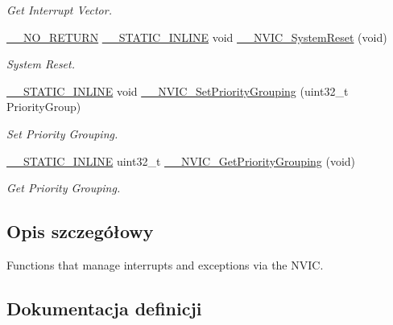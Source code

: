 \begin{DoxyCompactItemize}
\begin{DoxyCompactList}\small\item\em Get Interrupt Vector. \end{DoxyCompactList}\item 
\hyperlink{cmsis__iccarm_8h_a153a4a31b276a9758959580538720a51}{\+\_\+\+\_\+\+N\+O\+\_\+\+R\+E\+T\+U\+RN} \hyperlink{cmsis__iccarm_8h_aba87361bfad2ae52cfe2f40c1a1dbf9c}{\+\_\+\+\_\+\+S\+T\+A\+T\+I\+C\+\_\+\+I\+N\+L\+I\+NE} void \hyperlink{group___c_m_s_i_s___core___n_v_i_c_functions_ga0d9aa2d30fa54b41eb780c16e35b676c}{\+\_\+\+\_\+\+N\+V\+I\+C\+\_\+\+System\+Reset} (void)
\begin{DoxyCompactList}\small\item\em System Reset. \end{DoxyCompactList}\item 
\hyperlink{cmsis__iccarm_8h_aba87361bfad2ae52cfe2f40c1a1dbf9c}{\+\_\+\+\_\+\+S\+T\+A\+T\+I\+C\+\_\+\+I\+N\+L\+I\+NE} void \hyperlink{group___c_m_s_i_s___core___n_v_i_c_functions_gafc94dcbaee03e4746ade1f5bb9aaa56d}{\+\_\+\+\_\+\+N\+V\+I\+C\+\_\+\+Set\+Priority\+Grouping} (uint32\+\_\+t Priority\+Group)
\begin{DoxyCompactList}\small\item\em Set Priority Grouping. \end{DoxyCompactList}\item 
\hyperlink{cmsis__iccarm_8h_aba87361bfad2ae52cfe2f40c1a1dbf9c}{\+\_\+\+\_\+\+S\+T\+A\+T\+I\+C\+\_\+\+I\+N\+L\+I\+NE} uint32\+\_\+t \hyperlink{group___c_m_s_i_s___core___n_v_i_c_functions_ga9b894af672df4373eb637f8288845c05}{\+\_\+\+\_\+\+N\+V\+I\+C\+\_\+\+Get\+Priority\+Grouping} (void)
\begin{DoxyCompactList}\small\item\em Get Priority Grouping. \end{DoxyCompactList}\end{DoxyCompactItemize}


\subsection{Opis szczegółowy}
Functions that manage interrupts and exceptions via the N\+V\+IC. 



\subsection{Dokumentacja definicji}
\mbox{\label{group___c_m_s_i_s___core___n_v_i_c_functions_gab2072fe50f6d7cd208f6768919f59fae}} 

